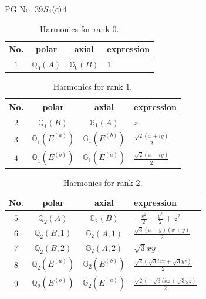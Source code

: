 \documentclass[fleqn,8pt,landscape]{jsarticle}
\begin{document}
\setcounter{MaxMatrixCols}{32}

\renewcommand{\tablename}{Table~}
\renewcommand{\figurename}{Figure~}
\begin{center}
\LARGE
PG No. 39\quad$S_{\rm 4}(c)$\quad$\bar{4}$\quad[ tetragonal ]
\end{center}
\begin{table}[ht!]
\begin{center}
\caption{Harmonics for rank 0.}
\renewcommand{\arraystretch}{1.3}
\begin{tabular}{cccl} \hline \hline
No. & polar & axial & expression \\ \hline
$ 1 $ & $ \mathbb{Q}_{0}(A) $ & $ \mathbb{G}_{0}(B) $ & $ 1 $ \\
 \hline \hline
\end{tabular}
\end{center}
\end{table}
\begin{table}[ht!]
\begin{center}
\caption{Harmonics for rank 1.}
\renewcommand{\arraystretch}{1.3}
\begin{tabular}{cccl} \hline \hline
No. & polar & axial & expression \\ \hline
$ 2 $ & $ \mathbb{Q}_{1}(B) $ & $ \mathbb{G}_{1}(A) $ & $ z $ \\
$ 3 $ & $ \mathbb{Q}_{1}(E^{(a)}) $ & $ \mathbb{G}_{1}(E^{(b)}) $ & $ \frac{\sqrt{2} \left(x + i y\right)}{2} $ \\
$ 4 $ & $ \mathbb{Q}_{1}(E^{(b)}) $ & $ \mathbb{G}_{1}(E^{(a)}) $ & $ \frac{\sqrt{2} \left(x - i y\right)}{2} $ \\
 \hline \hline
\end{tabular}
\end{center}
\end{table}
\begin{table}[ht!]
\begin{center}
\caption{Harmonics for rank 2.}
\renewcommand{\arraystretch}{1.3}
\begin{tabular}{cccl} \hline \hline
No. & polar & axial & expression \\ \hline
$ 5 $ & $ \mathbb{Q}_{2}(A) $ & $ \mathbb{G}_{2}(B) $ & $ - \frac{x^{2}}{2} - \frac{y^{2}}{2} + z^{2} $ \\
$ 6 $ & $ \mathbb{Q}_{2}(B,1) $ & $ \mathbb{G}_{2}(A,1) $ & $ \frac{\sqrt{3} \left(x - y\right) \left(x + y\right)}{2} $ \\
$ 7 $ & $ \mathbb{Q}_{2}(B,2) $ & $ \mathbb{G}_{2}(A,2) $ & $ \sqrt{3} x y $ \\
$ 8 $ & $ \mathbb{Q}_{2}(E^{(a)}) $ & $ \mathbb{G}_{2}(E^{(b)}) $ & $ \frac{\sqrt{2} \left(\sqrt{3} i x z + \sqrt{3} y z\right)}{2} $ \\
$ 9 $ & $ \mathbb{Q}_{2}(E^{(b)}) $ & $ \mathbb{G}_{2}(E^{(a)}) $ & $ \frac{\sqrt{2} \left(- \sqrt{3} i x z + \sqrt{3} y z\right)}{2} $ \\
 \hline \hline
\end{tabular}
\end{center}
\end{table}
\end{document}
